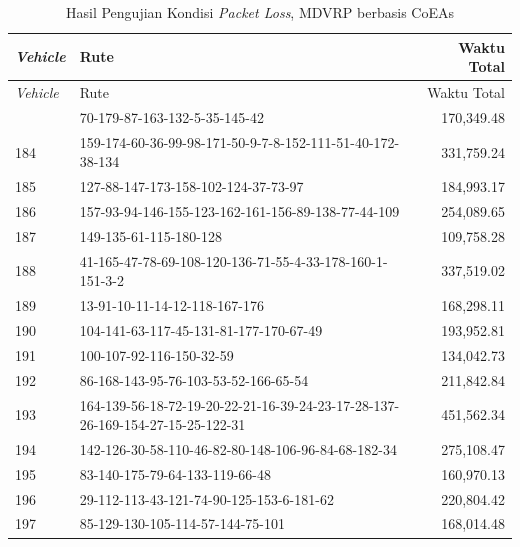 \begin{longtable}[!]{lp{8cm}r}
	\caption{Hasil Pengujian Kondisi \textit{Packet Loss}, MDVRP berbasis CoEAs}
	\label{tbl:test_result_packet_loss_field_coes}\\
	\toprule
	\textit{Vehicle} & Rute & Waktu Total\\ 
	\midrule
	\endfirsthead
	\toprule
	\textit{Vehicle} & Rute & Waktu Total\\ 
	\midrule
	\endhead
	\bottomrule
	\endfoot
	183 & 70-179-87-163-132-5-35-145-42 & 170,349.48 \\
	184 & 159-174-60-36-99-98-171-50-9-7-8-152-111-51-40-172-38-134 & 331,759.24 \\
	185 & 127-88-147-173-158-102-124-37-73-97 & 184,993.17 \\
	186 & 157-93-94-146-155-123-162-161-156-89-138-77-44-109 & 254,089.65 \\
	187 & 149-135-61-115-180-128 & 109,758.28 \\
	188 & 41-165-47-78-69-108-120-136-71-55-4-33-178-160-1-151-3-2 & 337,519.02 \\
	189 & 13-91-10-11-14-12-118-167-176 & 168,298.11 \\
	190 & 104-141-63-117-45-131-81-177-170-67-49 & 193,952.81 \\
	191 & 100-107-92-116-150-32-59 & 134,042.73 \\
	192 & 86-168-143-95-76-103-53-52-166-65-54 & 211,842.84 \\
	193 & 164-139-56-18-72-19-20-22-21-16-39-24-23-17-28-137-26-169-154-27-15-25-122-31 & 451,562.34 \\
	194 & 142-126-30-58-110-46-82-80-148-106-96-84-68-182-34 & 275,108.47 \\
	195 & 83-140-175-79-64-133-119-66-48 & 160,970.13 \\
	196 & 29-112-113-43-121-74-90-125-153-6-181-62 & 220,804.42 \\
	197 & 85-129-130-105-114-57-144-75-101 & 168,014.48 \\
\end{longtable}


